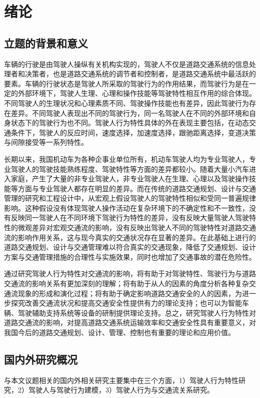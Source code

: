 \chapter{绪论}
\section{立题的背景和意义}

车辆的行驶是由驾驶人操纵有关机构实现的，驾驶人不仅是道路交通系统的信息处理者和决策者，也是道路交通系统的调节者和控制者，是道路交通系统中最活跃的要素。车辆的行驶状态是驾驶人所采取的驾驶行为的作用结果，而驾驶行为是在一定的外部环境下，驾驶人生理、心理和操作技能等驾驶特性相互作用的综合体现。不同驾驶人的生理状况和心理素质不同、驾驶操作技能也有差异，因此驾驶行为存在差异。不同驾驶人表现出不同的驾驶行为，同一名驾驶人在不同的外部环境和自身状态下的驾驶行为也不同。驾驶人行为特性具体的外在表现主要包括，在动态交通条件下，驾驶人的反应时间，速度选择，加速度选择，跟驰距离选择，变道决策与间隙接受等一系列特性。

长期以来，我国机动车为各种企事业单位所有，机动车驾驶人均为专业驾驶人，专业驾驶人的驾驶技能熟练程度、驾驶特性等方面的差异都较小。随着大量小汽车进入家庭，产生了大量的非专业驾驶人，非专业驾驶人在生理、心理以及驾驶操作技能等方面与专业驾驶人都存在明显的差异。而在传统的道路交通规划、设计与交通管理的研究和工程设计中，从宏观上假设驾驶人的驾驶特性相似和受同一普遍规律影响。这种假设没有体现驾驶人操作活动在复杂环境下的不确定性和不一致性，没有反映同一驾驶人在不同环境下驾驶行为特性的差异，没有反映大量驾驶人驾驶特性的微观差异对宏观交通流的影响，没有反映出驾驶人不同的驾驶特性对道路交通流的影响作用关系，这与现今真实的交通状况存在显著的差异。在此基础上进行的道路交通规划、设计与交通管理难以符合真实的交通现象，降低了交通规划、设计方案与交通管理措施的合理性与实施效果，同时也增加了交通事故的潜在危险性。

通过研究驾驶人行为特性对交通流的影响，将有助于对驾驶特性、驾驶行为与道路交通流的影响关系有更加深刻的理解；将有助于从人的因素的角度分析各种复杂交通流现象的形成和演化过程；将有助于确定影响道路交通安全的人的因素，为进一步探究改善交通流状况和提高交通安全性提供有力的理论支持；也可以为智能车辆、驾驶辅助支持系统等设备的研制提供理论支持。总之，研究驾驶人行为特性对道路交通流的影响，对提高道路交通系统运输效率和交通安全性具有重要意义，对我国今后的道路交通规划、设计、管理、控制也有重要的理论和应用价值。



\section{国内外研究概况}
与本文议题相关的国内外相关研究主要集中在三个方面，1）驾驶人行为特性研究，2）驾驶人与驾驶行为建模，3）驾驶人行为与交通流关系研究。

